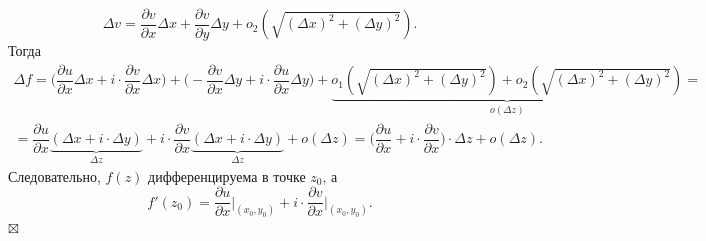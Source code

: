 \documentclass[a4paper, 12pt]{article}
\newenvironment{Proof} %
{\par\noindent{$\blacklozenge$}} %
{\hfill$\scriptstyle\boxtimes$}
\renewcommand{\d}{\partial}
\begin{document}
\begin{Proof}
	$$\Delta v = \dfrac{\d v}{\d x}\Delta x + \dfrac{\d v}{\d y}\Delta y + o_2(\sqrt{(\Delta x)^2 + (\Delta y)^2}).$$
	Тогда\begin{multline*}
		\Delta f = \Big(\dfrac{\d u}{\d x}\Delta x+ i\cdot \dfrac{\d v}{\d x}\Delta x\Big) + \Big(-\dfrac{\d v}{\d x}\Delta y + i\cdot \dfrac{\d u}{\d x}\Delta y\Big) + \underbrace{o_1(\sqrt{(\Delta x)^2 + (\Delta y)^2}) + o_2(\sqrt{(\Delta x)^2 + (\Delta y)^2})}_{o(\Delta z)}=\\=\dfrac{\d u}{\d x}\underbrace{(\Delta x + i\cdot \Delta y)}_{\Delta z} + i\cdot \dfrac{\d v}{\d x}\underbrace{(\Delta x + i\cdot \Delta y)}_{\Delta z} + o(\Delta z) = \Big(\dfrac{\d u}{\d x} + i\cdot \dfrac{\d v}{\d x}\Big)\cdot \Delta z + o(\Delta z).
	\end{multline*}
Следовательно, $f(z)$ дифференцируема в точке $z_0$, а $$f'(z_0) = \dfrac{\d u}{\d x}\Big |_{(x_0,y_0)} + i\cdot \dfrac{\d v}{\d x}\Big |_{(x_0,y_0)}.$$
\end{Proof}
\end{document}
